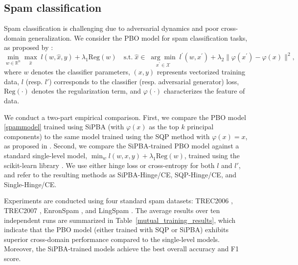 \documentclass{article}
\def\x{x}
\def\y{y}
\def\IR{\mathbb{R}}
\begin{document}
    \subsection{Spam classification}
    Spam classification is challenging due to adversarial dynamics and poor cross-domain generalization. We consider the PBO model for spam classification tasks, as proposed by \cite{bruckner2011stackelberg}:
	\begin{equation}\label{spammodel}
    \min_{w\in\IR^n}\max_{\hat{\x}}\;l(w,\hat{\x},\y)+\lambda_1 \text{Reg}(w)\quad \text{s.t.}\;\hat{\x}\in\;\underset{\x^\prime\in\mathcal{X}}{\arg\min}\; l^\prime(w,\x^\prime)+\lambda_2 \|\varphi(\x^\prime)-\varphi(\x)\|^2,
	\end{equation}
    where $w$ denotes the classifier parameters, $(\x,\y)$ represents vectorized training data, $l$ (resp. $l'$) corresponds to the classifier (resp. adversarial generator) loss, $\text{Reg}(\cdot)$ denotes the regularization term, and $\varphi(\cdot)$ characterizes the feature of data. 
	
    We conduct a two-part empirical comparison.  
    First, we compare the PBO model \eqref{spammodel} trained using SiPBA (with $\varphi(x)$ as the top $k$ principal components) to the same model trained using the SQP method with $\varphi(x) = x$, as proposed in \cite{bruckner2011stackelberg}.  
    Second, we compare the SiPBA-trained PBO model against a standard single-level model, $\min_{w} l(w,\x,\y) + \lambda_1 \text{Reg}(w)$, trained using the scikit-learn library \cite{pedregosa2011scikit}.
     We use either hinge loss or cross-entropy for both $l$ and $l'$, and refer to the resulting methods as SiPBA-Hinge/CE, SQP-Hinge/CE, and Single-Hinge/CE.
    
     Experiments are conducted using four standard spam datasets: TREC2006 \cite{ounis2006overview}, TREC2007 \cite{macdonald2007overview}, EnronSpam \cite{metsis2006spam}, and LingSpam \cite{androutsopoulos2000evaluation}. 
         The average results over ten independent runs are summarized in Table~\ref{mutual_training_results}, which indicate that the PBO model (either trained with SQP or SiPBA) exhibits superior cross-domain performance compared to the single-level models. Moreover, the SiPBA-trained models achieve the best overall accuracy and F1 score.
  
\end{document}

